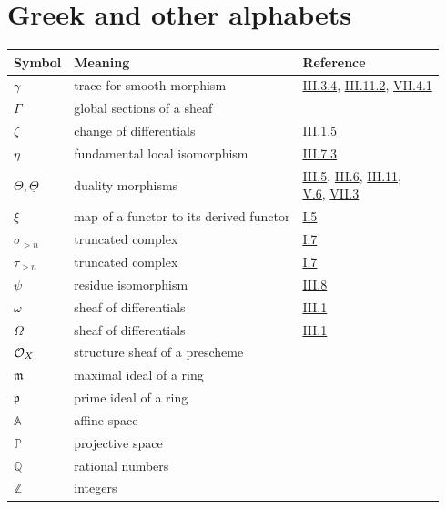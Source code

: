\section*{Greek and other alphabets}
\begin{longtable}{@{}l p{8cm} l@{}}
	\toprule
	Symbol & Meaning & Reference \\
	\midrule
	$\gamma$ & trace for smooth morphism & \hyperref[thm:3.3.4]{III.3.4}, \hyperref[cor:3.11.2]{III.11.2}, \hyperref[thm:7.4.1]{VII.4.1} \\
	$\Gamma$ & global sections of a sheaf & \\
	$\zeta$ & change of differentials & \hyperref[def:3.1.5]{III.1.5} \\
	$\eta$ & fundamental local isomorphism  & \hyperref[cor:3.7.3]{III.7.3} \\
	$\Theta,\underline{\Theta}$ & duality morphisms & \shortstack[l]{\hyperref[sec:3.5]{III.5}, \hyperref[sec:3.6]{III.6}, \hyperref[sec:3.11]{III.11},\\\hyperref[sec:5.6]{V.6}, \hyperref[sec:7.3]{VII.3}} \\
	$\xi$ & map of a functor to its derived functor & \hyperref[sec:1.5]{I.5} \\
	$\sigma_{>n}$ & truncated complex & \hyperref[sec:1.7]{I.7} \\
	$\tau_{>n}$ & truncated complex & \hyperref[sec:1.7]{I.7} \\
	$\psi$ & residue isomorphism & \hyperref[sec:3.8]{III.8} \\
	$\omega$ & sheaf of differentials & \hyperref[sec:3.1]{III.1} \\
	$\Omega$ & sheaf of differentials & \hyperref[sec:3.1]{III.1} \\
	$\mathcal{O}_X$ & structure sheaf of a prescheme & \\
	$\mathfrak{m}$ & maximal ideal of a ring & \\
	$\mathfrak{p}$ & prime ideal of a ring & \\
	$\mathbb{A}$ & affine space & \\
	$\mathbb{P}$ & projective space & \\
	$\mathbb{Q}$ & rational numbers & \\
	$\mathbb{Z}$ & integers & \\
\end{longtable}

